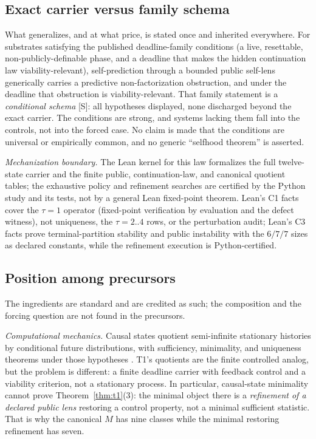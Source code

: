 \documentclass[11pt]{article}
\newcommand{\gradeS}{\textsf{[S]}}
\theoremstyle{definition}
\begin{document}
\subsection{Exact carrier versus family schema}
\label{sec:t1family}

What generalizes, and at what price, is stated once and inherited everywhere.
For substrates satisfying the published deadline-family conditions (a live,
resettable, non-publicly-definable phase, and a deadline that makes the hidden
continuation law viability-relevant), self-prediction through a bounded
public self-lens generically carries a predictive non-factorization
obstruction, and under the deadline that obstruction is viability-relevant.
That family statement is a \emph{conditional schema} \gradeS{}: all
hypotheses displayed, none discharged beyond the exact carrier. The
conditions are strong, and systems lacking them fall into the controls, not
into the forced case. No claim is made that the conditions are universal or
empirically common, and no generic ``selfhood theorem'' is asserted.

\emph{Mechanization boundary.} The Lean kernel for this law formalizes the
full twelve-state carrier and the finite public, continuation-law, and
canonical quotient tables; the exhaustive policy and refinement searches are
certified by the Python study and its tests, not by a general Lean fixed-point
theorem. Lean's C1 facts cover the $\tau=1$ operator (fixed-point verification
by evaluation and the defect witness), not uniqueness, the $\tau=2..4$ rows,
or the perturbation audit; Lean's C3 facts prove terminal-partition stability
and public instability with the $6/7/7$ sizes as declared constants, while the
refinement execution is Python-certified.

\subsection{Position among precursors}
\label{sec:t1position}

The ingredients are standard and are credited as such; the composition and
the forcing question are not found in the precursors.

\emph{Computational mechanics.} Causal states quotient semi-infinite
stationary histories by conditional future distributions, with sufficiency,
minimality, and uniqueness theorems under those hypotheses
\citep{CrutchfieldYoung1989, ShaliziCrutchfield2001}. T1's quotients are the
finite controlled analog, but the problem is different: a finite deadline
carrier with feedback control and a viability criterion, not a stationary
process. In particular, causal-state minimality cannot prove
Theorem~\ref{thm:t1}(3): the minimal object there is a \emph{refinement of a
declared public lens} restoring a control property, not a minimal sufficient
statistic. That is why the canonical $M$ has nine classes while the minimal
restoring refinement has seven.
\end{document}
